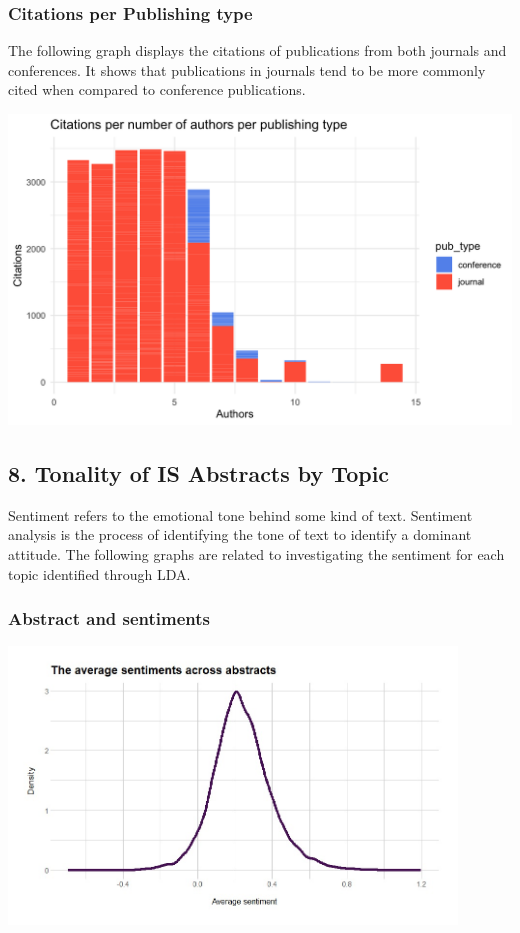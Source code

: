 \documentclass[
  letterpaper,
  DIV=11,
  numbers=noendperiod]{scrartcl}
\begin{document}
\hypertarget{citations-per-publishing-type}{%
\subsubsection{Citations per Publishing
type}\label{citations-per-publishing-type}}

The following graph displays the citations of publications from both
journals and conferences. It shows that publications in journals tend to
be more commonly cited when compared to conference publications.

\includegraphics{images/cite_auth_type.png}

\newpage{}

\hypertarget{tonality-of-is-abstracts-by-topic}{%
\subsection{\texorpdfstring{8. \textbf{Tonality of IS Abstracts by
Topic}}{8. Tonality of IS Abstracts by Topic}}\label{tonality-of-is-abstracts-by-topic}}

Sentiment refers to the emotional tone behind some kind of text.
Sentiment analysis is the process of identifying the tone of text to
identify a dominant attitude. The following graphs are related to
investigating the sentiment for each topic identified through LDA.

\hypertarget{abstract-and-sentiments}{%
\subsubsection{Abstract and sentiments}\label{abstract-and-sentiments}}

\includegraphics[width=4.6875in,height=\textheight]{images/aveSentiment.jpg}
\end{document}
